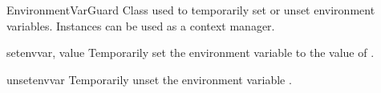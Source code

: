 \begin{classdesc}{EnvironmentVarGuard}{}
Class used to temporarily set or unset environment variables.  Instances can be
used as a context manager.
\end{classdesc}

\begin{methoddesc}{set}{envvar, value}
Temporarily set the environment variable  to the value of
.
\end{methoddesc}

\begin{methoddesc}{unset}{envvar}
Temporarily unset the environment variable .
\end{methoddesc}

